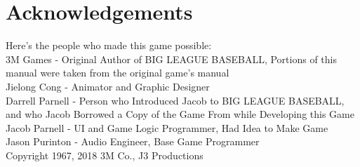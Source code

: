 \documentclass[12pt,a4paper]{report}
\begin{document}
\chapter{Acknowledgements}

Here's the people who made this game possible:\\

3M Games - Original Author of BIG LEAGUE BASEBALL, Portions of this manual were taken from the original game's manual\\

Jielong Cong - Animator and Graphic Designer\\

Darrell Parnell - Person who Introduced Jacob to BIG LEAGUE BASEBALL, and who Jacob Borrowed a Copy of the Game From while Developing this Game\\

Jacob Parnell - UI and Game Logic Programmer, Had Idea to Make Game\\

Jason Purinton - Audio Engineer, Base Game Programmer\\

\bigskip\bigskip\bigskip\bigskip\bigskip\bigskip\bigskip\bigskip\bigskip\bigskip\bigskip\bigskip\bigskip\bigskip\bigskip\bigskip\bigskip\bigskip\bigskip\bigskip\bigskip\bigskip\bigskip\bigskip\bigskip\bigskip
Copyright 1967, 2018 3M Co., J3 Productions
\end{document}
